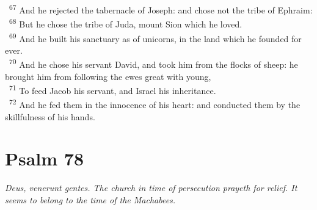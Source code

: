 \documentclass[a5paper,12pt]{article}
\begin{document}
\begin{multicols*}{2}
~\textsuperscript{67} And he rejected the tabernacle of Joseph: and chose not the tribe of Ephraim:\\
~\textsuperscript{68} But he chose the tribe of Juda, mount Sion which he loved.\\
~\textsuperscript{69} And he built his sanctuary as of unicorns, in the land which he founded for ever.\\
~\textsuperscript{70} And he chose his servant David, and took him from the flocks of sheep: he brought him from following the ewes great with young,\\
~\textsuperscript{71} To feed Jacob his servant, and Israel his inheritance.\\
~\textsuperscript{72} And he fed them in the innocence of his heart: and conducted them by the skillfulness of his hands.\\

\section{Psalm 78}
\label{sec:orgcf055e2}
\emph{Deus, venerunt gentes. The church in time of persecution prayeth for relief. It seems to belong to the time of the Machabees.}\\


\end{multicols*}
\end{document}
